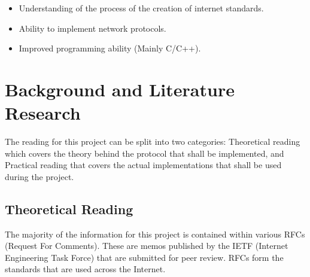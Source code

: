 \documentclass[12pt]{report}
\begin{document}
\begin{itemize}
	\item Understanding of the process of the creation of internet standards.
	\item Ability to implement network protocols. 
	\item Improved programming ability (Mainly C/C++).
\end{itemize}

\chapter{Background and Literature Research}

The reading for this project can be split into two categories: Theoretical
reading which covers the theory behind the protocol that shall be implemented,
and Practical reading that covers the actual implementations that shall be used
during the project.

\section{Theoretical Reading}
The majority of the information for this project is contained within various
RFCs (Request For Comments).  These are memos published by the IETF (Internet
Engineering Task Force) that are submitted for peer review.  RFCs form the
standards that are used across the Internet.
\end{document}
